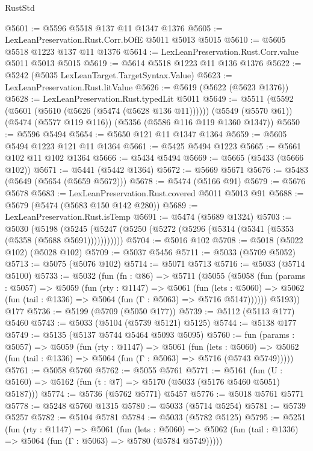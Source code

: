 \begin{lexlean}{RustStd}
\begin{coremodule}
@5601 := @5596 @5518 @137 @11 @1347 @1376
@5605 := LexLeanPreservation.Rust.Corr.bOfE @5011 @5013 @5015
@5610 := @5605 @5518 @1223 @137 @11 @1376
@5614 := LexLeanPreservation.Rust.Corr.value @5011 @5013 @5015
@5619 := @5614 @5518 @1223 @11 @136 @1376
@5622 := @5242 (@5035 LexLeanTarget.TargetSyntax.Value)
@5623 := LexLeanPreservation.Rust.litValue
@5626 := @5619 (@5622 (@5623 @1376))
@5628 := LexLeanPreservation.Rust.typedLit @5011
@5649 := @5511
    (@5592 (@5601 (@5610 (@5626 (@5474 (@5628 @136 @11))))))
    (@5549 (@5570 @61))
    (@5474 (@5577 @119 @116))
    (@5356 (@5586 @116 @119 @1360 @1347))
@5650 := @5596 @5494
@5654 := @5650 @121 @11 @1347 @1364
@5659 := @5605 @5494 @1223 @121 @11 @1364
@5661 := @5425 @5494 @1223
@5665 := @5661 @102 @11 @102 @1364
@5666 := @5434 @5494
@5669 := @5665 (@5433 (@5666 @102))
@5671 := @5441 (@5442 @1364)
@5672 := @5669 @5671
@5676 := @5483 (@5649 (@5654 (@5659 @5672)))
@5678 := @5474 (@5166 @91)
@5679 := @5676 @5678
@5683 := LexLeanPreservation.Rust.covered @5011 @5013 @91
@5688 := @5679 (@5474 (@5683 @150 @142 @280))
@5689 := LexLeanPreservation.Rust.isTemp
@5691 := @5474 (@5689 @1324)
@5703 := @5030
    (@5198 (@5245 (@5247 (@5250 (@5272 (@5296 (@5314 (@5341 (@5353 (@5358 (@5688 @5691)))))))))))
@5704 := @5016 @102
@5708 := @5018 (@5022 @102) (@5028 @102)
@5709 := @5037 @5456
@5711 := @5033 (@5709 @5052)
@5713 := @5075 (@5076 @102)
@5714 := @5071 @5713
@5716 := @5033 (@5714 @5100)
@5733 := @5032
    (fun (fn : @86) =>
    @5711
      (@5055
        (@5058
          (fun (params : @5057) =>
          @5059
            (fun (rty : @1147) =>
            @5061
              (fun (lets : @5060) =>
              @5062 (fun (tail : @1336) => @5064 (fun (Γ : @5063) => @5716 @5147))))))
        @5193))
    @177
@5736 := @5199 (@5709 (@5050 @177))
@5739 := @5112 (@5113 @177) @5460
@5743 := @5033 (@5104 (@5739 @5121) @5125)
@5744 := @5138 @177
@5749 := @5135 (@5137 @5744 @5464 @5093 @5095)
@5760 := fun (params : @5057) =>
  @5059
    (fun (rty : @1147) =>
    @5061
      (fun (lets : @5060) =>
      @5062 (fun (tail : @1336) => @5064 (fun (Γ : @5063) => @5716 (@5743 @5749)))))
@5761 := @5058 @5760
@5762 := @5055 @5761
@5771 := @5161 (fun (U : @5160) => @5162 (fun (t : @7) => @5170 (@5033 (@5176 @5460 @5051) @5187)))
@5774 := @5736 (@5762 @5771) @5457
@5776 := @5018 @5761 @5771
@5778 := @5248 @5760 @1315
@5780 := @5033 (@5714 @5254)
@5781 := @5739 @5257
@5782 := @5104 @5781
@5784 := @5033 (@5782 @5125)
@5795 := @5251
    (fun (rty : @1147) =>
    @5061
      (fun (lets : @5060) =>
      @5062 (fun (tail : @1336) => @5064 (fun (Γ : @5063) => @5780 (@5784 @5749)))))

\end{coremodule}
\end{lexlean}
